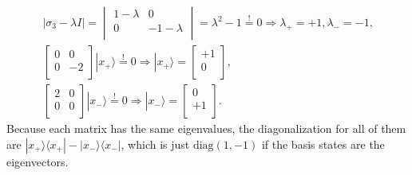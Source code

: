 \documentclass[a4paper,12pt]{article}
\newcommand{\la}{\langle}
\newcommand{\ra}{\rangle}
\begin{document}
    \begin{gather}
        \nonumber
        | \sigma_3 - \lambda I | =
        \begin{vmatrix}
            1-\lambda & 0 \\
            0 & -1-\lambda \\
        \end{vmatrix} = \lambda^2 - 1 \overset{!}{=} 0 \Rightarrow \lambda_+ = +1, \lambda_- = -1 \textrm{,} \\
        \nonumber
        \begin{bmatrix}
            0 & 0 \\
            0 & -2 \\
        \end{bmatrix} | x_+ \ra \overset{!}{=} 0 \Rightarrow | x_+ \ra =
        \begin{bmatrix}
            +1 \\
            0 \\
        \end{bmatrix} \textrm{,} \\
        \begin{bmatrix}
            2 & 0 \\
            0 & 0 \\
        \end{bmatrix} | x_- \ra \overset{!}{=} 0 \Rightarrow | x_- \ra =
        \begin{bmatrix}
            0 \\
            +1 \\
        \end{bmatrix} \textrm{.}
    \end{gather}
    Because each matrix has the same eigenvalues, the diagonalization for all of them are $| x_+ \ra \la x_+ | - | x_- \ra \la x_- |$, which is just $\textrm{diag}(1, -1)$ if the basis states are the eigenvectors.
\end{document}
